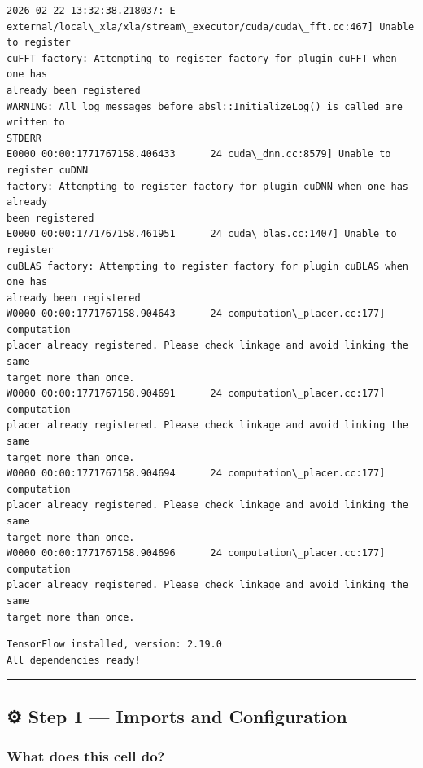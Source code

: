 \documentclass[11pt]{article}
\begin{document}
    \begin{Verbatim}[commandchars=\\\{\}]
2026-02-22 13:32:38.218037: E
external/local\_xla/xla/stream\_executor/cuda/cuda\_fft.cc:467] Unable to register
cuFFT factory: Attempting to register factory for plugin cuFFT when one has
already been registered
WARNING: All log messages before absl::InitializeLog() is called are written to
STDERR
E0000 00:00:1771767158.406433      24 cuda\_dnn.cc:8579] Unable to register cuDNN
factory: Attempting to register factory for plugin cuDNN when one has already
been registered
E0000 00:00:1771767158.461951      24 cuda\_blas.cc:1407] Unable to register
cuBLAS factory: Attempting to register factory for plugin cuBLAS when one has
already been registered
W0000 00:00:1771767158.904643      24 computation\_placer.cc:177] computation
placer already registered. Please check linkage and avoid linking the same
target more than once.
W0000 00:00:1771767158.904691      24 computation\_placer.cc:177] computation
placer already registered. Please check linkage and avoid linking the same
target more than once.
W0000 00:00:1771767158.904694      24 computation\_placer.cc:177] computation
placer already registered. Please check linkage and avoid linking the same
target more than once.
W0000 00:00:1771767158.904696      24 computation\_placer.cc:177] computation
placer already registered. Please check linkage and avoid linking the same
target more than once.
    \end{Verbatim}

    \begin{Verbatim}[commandchars=\\\{\}]
TensorFlow installed, version: 2.19.0
All dependencies ready!
    \end{Verbatim}

    \begin{center}\rule{0.5\linewidth}{0.5pt}\end{center}

\subsection{⚙️ Step 1 --- Imports and
Configuration}\label{step-1-imports-and-configuration}

\subsubsection{What does this cell do?}\label{what-does-this-cell-do}
\end{document}
